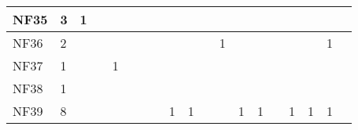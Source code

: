 \begin{table}[]
{\begin{tabular}{|l|l|l|l|l|l|l|l|l|l|l|l|l|l|l|l|l|l|l|}
NF35 & 3                                                     & 1                                                &    &    &    &    &                                                  &    &    &    &    &                                                   &    &                                                   &    &                                                             &                                                             &                                                             \\ \hline
NF36 & 2                                                     &                                                  &    &    &    &    &                                                  &    &    &    & 1  &                                                   &    &                                                   &    &                                                             & 1                                                           &                                                             \\ \hline
NF37 & 1                                                     &                                                  &    & 1  &    &    &                                                  &    &    &    &    &                                                   &    &                                                   &    &                                                             &                                                             &                                                             \\ \hline
NF38 & 1                                                     &                                                  &    &    &    &    &                                                  &    &    &    &    &                                                   &    &                                                   &    &                                                             &                                                             &                                                             \\ \hline
NF39 & 8                                                     &                                                  &    &    &    &    &                                                  & 1  & 1  &    &    & 1                                                 & 1  &                                                   & 1  & 1                                                           & 1                                                           &                                                             \\ \hline

\end{tabular}}
\end{table}
